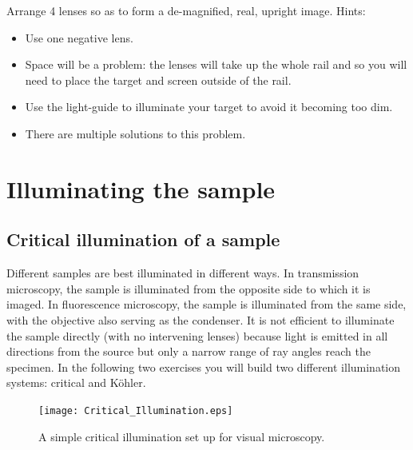 \documentclass[a4paper]{report}
\newcommand{\nexercise}[0]{\arabic{exercises}\addtocounter{exercises}{1}}
\begin{document}
\clearpage
\begin{exercisebox}[frametitle={Exercise \nexercise: Optics challenge}]
Arrange 4 lenses so as to form a de-magnified, real, upright
image. Hints: 
\begin{itemize}
\item Use one negative lens.
\item Space will be a problem: the lenses will take up the whole rail
  and so you will need to place the target and screen outside of the
  rail. 
\item Use the light-guide to illuminate your target to avoid it
  becoming too dim. 
\item There are multiple solutions to this problem.
\end{itemize}
\end{exercisebox}

\clearpage
\section{Illuminating the sample}
\subsection{Critical illumination of a sample}

Different samples are best illuminated in different ways.
In transmission microscopy, the sample is illuminated from the opposite side to which it is imaged. 
In fluorescence microscopy, the sample is illuminated from the same side, with the objective also serving as the condenser. 
It is not efficient to illuminate the sample directly (with no intervening lenses) because light is emitted in all directions from the source but only a narrow range of ray angles reach the specimen. 
In the following two exercises you will build two different illumination systems: critical and K\"{o}hler. 

\begin{figure}[h]
\center
\texttt{[image: Critical\_Illumination.eps]}
\caption{A simple critical illumination set up for visual microscopy.}
\label{critIlum}
\end{figure}
\end{document}

